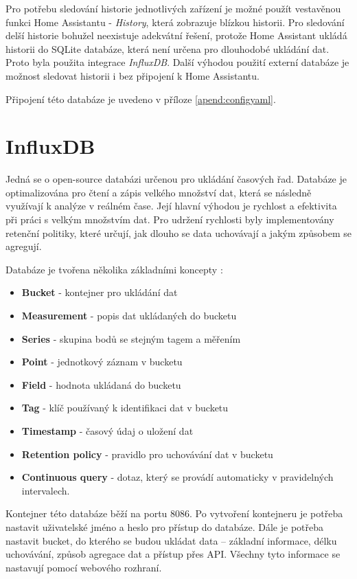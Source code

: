 Pro potřebu sledování historie jednotlivých zařízení je možné použít vestavěnou funkci Home Assistantu - \textit{History}, která zobrazuje blízkou historii. Pro sledování delší historie bohužel neexistuje adekvátní řešení, protože Home Assistant ukládá historii do SQLite databáze, která není určena pro dlouhodobé ukládání dat. Proto byla použita integrace \textit{InfluxDB}. Další výhodou použití externí databáze je možnost sledovat historii i bez připojení k Home Assistantu. 

Připojení této databáze je uvedeno v příloze \ref{apend:configyaml}.
\section{InfluxDB}
Jedná se o open-source databázi určenou pro ukládání časových řad. Databáze je optimalizována pro čtení a zápis velkého množství dat, která se následně využívají k analýze v reálném čase. Její hlavní výhodou je rychlost a efektivita při práci s velkým množstvím dat. Pro udržení rychlosti byly implementovány retenční politiky, které určují, jak dlouho se data uchovávají a jakým způsobem se agregují. \cite{InfluxDB} \newline

Databáze je tvořena několika základními koncepty \cite{InfluxDBKeyConcepts}:
\begin{itemize}
    \item \textbf{Bucket} - kontejner pro ukládání dat
    \item \textbf{Measurement} - popis dat ukládaných do bucketu
    \item \textbf{Series} - skupina bodů se stejným tagem a měřením
    \item \textbf{Point} - jednotkový záznam v bucketu
    \item \textbf{Field} - hodnota ukládaná do bucketu
    \item \textbf{Tag} - klíč používaný k identifikaci dat v bucketu
    \item \textbf{Timestamp} - časový údaj o uložení dat
    \item \textbf{Retention policy} - pravidlo pro uchovávání dat v bucketu
    \item \textbf{Continuous query} - dotaz, který se provádí automaticky v pravidelných intervalech.  \newline
\end{itemize}
Kontejner této databáze běží na portu 8086. Po vytvoření kontejneru je potřeba nastavit uživatelské jméno a heslo pro přístup do databáze. Dále je potřeba nastavit bucket, do kterého se budou ukládat data – základní informace, délku uchovávání, způsob agregace dat a přístup přes API. Všechny tyto informace se nastavují pomocí webového rozhraní.

